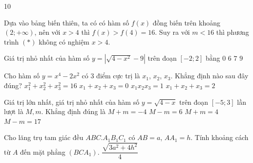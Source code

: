 \begin{indapan}{10}
\begin{ex}
{\begin{center}
		\end{center}
		Dựa vào bảng biến thiên, ta có có hàm số $f(x)$ đồng biến trên khoảng $(2;+\infty )$, nên với $x>4$ thì $f(x)>f(4)=16$. Suy ra với $m<16$ thì phương trình $(*)$ không có nghiệm $x>4$.} 
\end{ex} 
\begin{ex}%
	Giá trị nhỏ nhất của hàm số $y=|\sqrt{4-x^2}-9|$ trên đoạn $\left[-2;2\right]$ bằng 
	\choice 
	{$0$}
	{$6$}
	{\True $7$}
	{$9$} 
\end{ex} 
\begin{ex}%
	Cho hàm số $y=x^4-2x^2$ có $3$ điểm cực trị là $x_1$, $x_2$, $x_3$. Khẳng định nào sau đây đúng? 
	\choice 
	{$x_1^2+x_2^2+x_3^2=16$}
	{\True $x_1+x_2+x_3=0$}
	{$x_1x_2x_3=1$}
	{$x_1+x_2+x_3=2$} 
\end{ex} 
\begin{ex}%
	Giá trị lớn nhất, giá trị nhỏ nhất của hàm số $y=\sqrt{4-x}$ trên đoạn $\left[-5;3\right]$ lần lượt là $M, m$. Khẳng định đúng là 
	\choice 
	{$M+m=-4$}
	{$M-m=6$}
	{\True $M+m=4$}
	{$M-m=17$} 
	\loigiai{
		Tập xác định: $\mathscr{D}=\left(-\infty ;4\right]$.\\ 
		Ta có: $y'=\dfrac{-1}{2\sqrt{4-x}}<0,\,\forall x\in \left(-\infty ;4\right)$.\\ 
		$\Rightarrow\heva {&M=\max\limits_{\left[-5;3\right]}y=y(-5)=3\\&m=\min\limits_{\left[-5;3\right]}y=y(3)=1}$ 
		$\Rightarrow M+m=4$.} 
\end{ex} 
\begin{ex}%
	Cho lăng trụ tam giác đều $ABC.A_1B_1C_1$ có $AB=a$, $AA_1=h$. Tính khoảng cách từ $A$ đến mặt phẳng $(BCA_1)$.
	\choice 
	{$\dfrac{\sqrt{3a^2+4h^2}}{4}$}

\end{ex}
\end{indapan}
